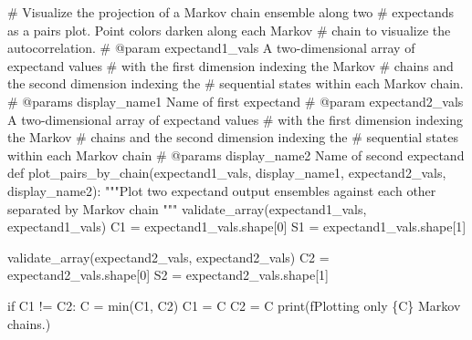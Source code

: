 \documentclass[
  letterpaper,
  DIV=11,
  numbers=noendperiod]{scrartcl}
\newenvironment{Shaded}{\begin{snugshade}}{\end{snugshade}}
\newcommand{\BuiltInTok}[1]{\textcolor[rgb]{0.00,0.23,0.31}{#1}}
\newcommand{\CommentTok}[1]{\textcolor[rgb]{0.37,0.37,0.37}{#1}}
\newcommand{\ControlFlowTok}[1]{\textcolor[rgb]{0.00,0.23,0.31}{#1}}
\newcommand{\DecValTok}[1]{\textcolor[rgb]{0.68,0.00,0.00}{#1}}
\newcommand{\KeywordTok}[1]{\textcolor[rgb]{0.00,0.23,0.31}{#1}}
\newcommand{\NormalTok}[1]{\textcolor[rgb]{0.00,0.23,0.31}{#1}}
\newcommand{\OperatorTok}[1]{\textcolor[rgb]{0.37,0.37,0.37}{#1}}
\newcommand{\SpecialCharTok}[1]{\textcolor[rgb]{0.37,0.37,0.37}{#1}}
\newcommand{\SpecialStringTok}[1]{\textcolor[rgb]{0.13,0.47,0.30}{#1}}
\newcommand{\StringTok}[1]{\textcolor[rgb]{0.13,0.47,0.30}{#1}}
\begin{document}
\begin{Shaded}
\begin{Highlighting}[]
\CommentTok{\# Visualize the projection of a Markov chain ensemble along two}
\CommentTok{\# expectands as a pairs plot.  Point colors darken along each Markov}
\CommentTok{\# chain to visualize the autocorrelation.}
\CommentTok{\# @param expectand1\_vals A two{-}dimensional array of expectand values}
\CommentTok{\#                        with the first dimension indexing the Markov}
\CommentTok{\#                        chains and the second dimension indexing the}
\CommentTok{\#                        sequential states within each Markov chain.}
\CommentTok{\# @params display\_name1 Name of first expectand}
\CommentTok{\# @param expectand2\_vals A two{-}dimensional array of expectand values}
\CommentTok{\#                        with the first dimension indexing the Markov}
\CommentTok{\#                        chains and the second dimension indexing the}
\CommentTok{\#                        sequential states within each Markov chain}
\CommentTok{\# @params display\_name2 Name of second expectand}
\KeywordTok{def}\NormalTok{ plot\_pairs\_by\_chain(expectand1\_vals, display\_name1,}
\NormalTok{                        expectand2\_vals, display\_name2):}
  \CommentTok{"""Plot two expectand output ensembles against each other separated by}
\CommentTok{     Markov chain """}
\NormalTok{  validate\_array(expectand1\_vals, }\StringTok{\textquotesingle{}expectand1\_vals\textquotesingle{}}\NormalTok{)}
\NormalTok{  C1 }\OperatorTok{=}\NormalTok{ expectand1\_vals.shape[}\DecValTok{0}\NormalTok{]}
\NormalTok{  S1 }\OperatorTok{=}\NormalTok{ expectand1\_vals.shape[}\DecValTok{1}\NormalTok{]}
  
\NormalTok{  validate\_array(expectand2\_vals, }\StringTok{\textquotesingle{}expectand2\_vals\textquotesingle{}}\NormalTok{)}
\NormalTok{  C2 }\OperatorTok{=}\NormalTok{ expectand2\_vals.shape[}\DecValTok{0}\NormalTok{]}
\NormalTok{  S2 }\OperatorTok{=}\NormalTok{ expectand2\_vals.shape[}\DecValTok{1}\NormalTok{]}
    
  \ControlFlowTok{if}\NormalTok{ C1 }\OperatorTok{!=}\NormalTok{ C2:}
\NormalTok{    C }\OperatorTok{=} \BuiltInTok{min}\NormalTok{(C1, C2)}
\NormalTok{    C1 }\OperatorTok{=}\NormalTok{ C}
\NormalTok{    C2 }\OperatorTok{=}\NormalTok{ C}
    \BuiltInTok{print}\NormalTok{(}\SpecialStringTok{f\textquotesingle{}Plotting only }\SpecialCharTok{\{}\NormalTok{C}\SpecialCharTok{\}}\SpecialStringTok{ Markov chains.\textquotesingle{}}\NormalTok{)}
  

\end{Highlighting}
\end{Shaded}
\end{document}
